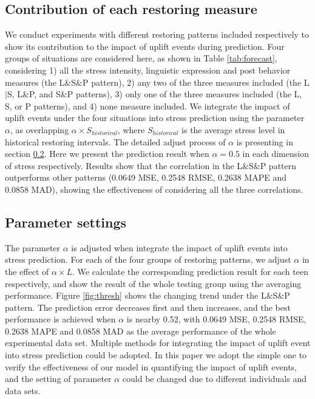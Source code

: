 \subsection{Contribution of each restoring measure}
We conduct experiments with different restoring patterns included respectively to show
its contribution to the impact of uplift events during prediction.
Four groups of situations are considered here, as shown in Table \ref{tab:forecast},
considering
1) all the stress intensity, linguistic expression and post behavior measures (the L\&S\&P pattern),
2) any two of the three measures included (the L$|$S, L\&P, and S\&P patterns),
3) only one of the three measures included (the L, S, or P patterns),
and 4) none measure included.
We integrate the impact of uplift events under the four situations into stress prediction
using the parameter $\alpha$,
as overlapping $\alpha \times S_{historical}$,
where $S_{historical}$ is the average stress level in historical restoring intervals.
The detailed adjust process of $\alpha$  is presenting in section \ref{sec:parameter}.
Here we present the prediction result when $\alpha = 0.5$ in each dimension of stress respectively.
Results show that the correlation in the L\&S\&P pattern outperforms other patterns
(0.0649 MSE, 0.2548 RMSE, 0.2638 MAPE and 0.0858 MAD),
showing the effectiveness of considering all the three correlations.

\subsection{Parameter settings}
\label{sec:parameter}
The parameter $\alpha$ is adjusted when integrate the impact of uplift events into stress prediction.
For each of the four groups of restoring patterns,
we adjust $\alpha$ in the effect of $\alpha \times L$.
We calculate the corresponding prediction result for each teen respectively,
and show the result of the whole testing group using the averaging performance.
Figure \ref{fig:thresh} shows the changing trend under the L\&S\&P pattern.
The prediction error decreases first and then increases,
and the best performance is achieved when $\alpha$ is nearby 0.52,
with 0.0649 MSE, 0.2548 RMSE, 0.2638 MAPE and 0.0858 MAD as the average performance of the whole experimental data set.
Multiple methods for integrating the impact of uplift event into stress prediction could be adopted.
In this paper we adopt the simple one to verify the effectiveness of our model in quantifying the impact of uplift events,
and the setting of parameter $\alpha$ could be changed due to different individuals and data sets.
